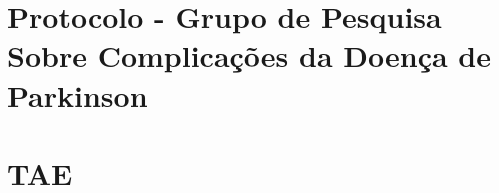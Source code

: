 \begin{apendicesenv}
	\partapendices
	\chapter{Protocolo - Grupo de Pesquisa Sobre Complicações
	da Doença de Parkinson}  
	\label{apendicprotocolo}
		
	\chapter{TAE}
	\label{apendicetae}
		

\end{apendicesenv}